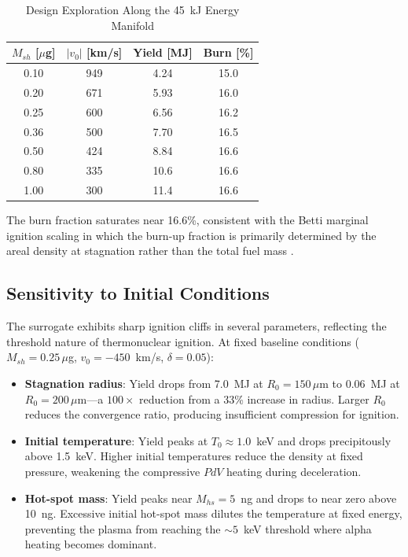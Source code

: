 \documentclass[conference]{IEEEtran}
\begin{document}
\begin{table}[htbp]
\caption{Design Exploration Along the 45~kJ Energy Manifold}
\label{tab:ke_sweep}
\centering
\begin{tabular}{cccc}
\toprule
$M_{sh}$ [$\mu$g] & $|v_0|$ [km/s] & Yield [MJ] & Burn [\%] \\
\midrule
0.10 & 949 & 4.24 & 15.0 \\
0.20 & 671 & 5.93 & 16.0 \\
0.25 & 600 & 6.56 & 16.2 \\
0.36 & 500 & 7.70 & 16.5 \\
0.50 & 424 & 8.84 & 16.6 \\
0.80 & 335 & 10.6 & 16.6 \\
1.00 & 300 & 11.4 & 16.6 \\
\bottomrule
\end{tabular}
\end{table}

The burn fraction saturates near 16.6\%, consistent with the Betti marginal ignition scaling in which the burn-up fraction is primarily determined by the areal density at stagnation rather than the total fuel mass \cite{betti2002}.

\subsection{Sensitivity to Initial Conditions}

The surrogate exhibits sharp ignition cliffs in several parameters, reflecting the threshold nature of thermonuclear ignition.  At fixed baseline conditions ($M_{sh} = 0.25\,\mu$g, $v_0 = -450$~km/s, $\delta = 0.05$):

\begin{itemize}
    \item \textbf{Stagnation radius}: Yield drops from 7.0~MJ at $R_0 = 150\,\mu$m to 0.06~MJ at $R_0 = 200\,\mu$m---a $100\times$ reduction from a 33\% increase in radius.  Larger $R_0$ reduces the convergence ratio, producing insufficient compression for ignition.

    \item \textbf{Initial temperature}: Yield peaks at $T_0 \approx 1.0$~keV and drops precipitously above 1.5~keV.  Higher initial temperatures reduce the density at fixed pressure, weakening the compressive $PdV$ heating during deceleration.

    \item \textbf{Hot-spot mass}: Yield peaks near $M_{hs} = 5$~ng and drops to near zero above 10~ng.  Excessive initial hot-spot mass dilutes the temperature at fixed energy, preventing the plasma from reaching the $\sim$$5$~keV threshold where alpha heating becomes dominant.
\end{itemize}
\end{document}
